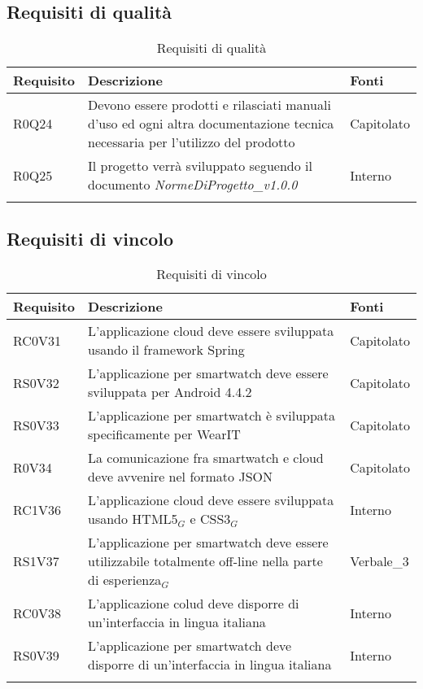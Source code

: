 \subsection{Requisiti di qualità}
\begin{center}
\bgroup
\def\arraystretch{1.8}
\begin{longtable}{|l|p{7cm}|p{1.7cm}|} \hline
\textbf{Requisito} & \textbf{Descrizione} & \textbf{Fonti} \\\hline
R0Q24		& Devono essere prodotti e rilasciati manuali d’uso ed ogni altra documentazione tecnica necessaria per l’utilizzo del prodotto & Capitolato \\\hline
R0Q25		& Il progetto verrà sviluppato seguendo il documento \textit{NormeDiProgetto\_v1.0.0} & Interno \\\hline
\caption{Requisiti di qualità}
\end{longtable}
\egroup
\end{center}

\subsection{Requisiti di vincolo}
\begin{center}
\bgroup
\def\arraystretch{1.8}
\begin{longtable}{|l|p{7cm}|p{1.7cm}|} \hline
\textbf{Requisito} & \textbf{Descrizione} & \textbf{Fonti} \\\hline
RC0V31		& L'applicazione cloud deve essere sviluppata usando il framework Spring & Capitolato \\\hline
RS0V32		& L'applicazione per smartwatch deve essere sviluppata per Android 4.4.2 & Capitolato \\\hline
RS0V33		& L'applicazione per smartwatch è sviluppata specificamente per WearIT & Capitolato \\\hline
R0V34		& La comunicazione fra smartwatch e cloud deve avvenire nel formato JSON & Capitolato \\\hline
RC1V36		& L'applicazione cloud deve essere sviluppata usando HTML5$_{G}$ e CSS3$_{G}$ & Interno \\\hline
RS1V37		& L'applicazione per smartwatch deve essere utilizzabile totalmente off-line nella parte di esperienza$_{G}$ & Verbale\_3 \\\hline
RC0V38		& L'applicazione colud deve disporre di un'interfaccia in lingua italiana & Interno \\\hline
RS0V39		& L'applicazione per smartwatch deve disporre di un'interfaccia in lingua italiana & Interno \\\hline
\caption{Requisiti di vincolo}
\end{longtable}
\egroup
\end{center}

